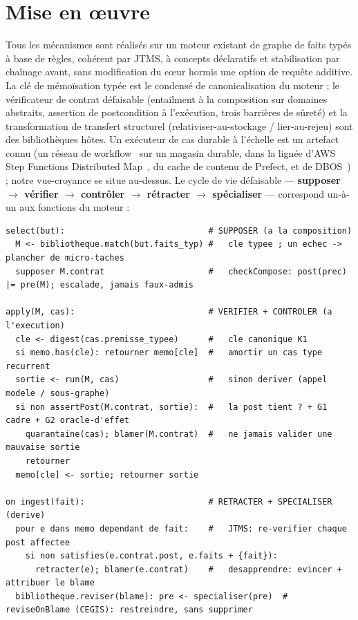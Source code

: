 \documentclass[11pt]{article}
\begin{document}
\section{Mise en œuvre}
Tous les mécanismes sont réalisés sur un moteur existant de graphe de faits typés à base de règles, cohérent par
JTMS, à concepts déclaratifs et stabilisation par chaînage avant, sans modification du cœur hormis une option de
requête additive. La clé de mémoïsation typée est le condensé de canonicalisation du moteur ; le vérificateur de
contrat défaisable (entailment à la composition sur domaines abstraits, assertion de postcondition à l'exécution,
trois barrières de sûreté) et la transformation de transfert structurel (relativiser-au-stockage /
lier-au-rejeu) sont des bibliothèques hôtes. Un exécuteur de cas durable à l'échelle est un artefact connu (un
réseau de workflow~\cite{vanderaalst1998} sur un magasin durable, dans la lignée d'AWS Step Functions Distributed
Map~\cite{aws2022}, du cache de contenu de Prefect, et de DBOS~\cite{dbos2022}) ; notre vue-croyance se situe
au-dessus. Le cycle de vie défaisable --- \textbf{supposer $\to$ vérifier $\to$ contrôler $\to$ rétracter $\to$
spécialiser} --- correspond un-à-un aux fonctions du moteur :

\begin{lstlisting}
select(but):                             # SUPPOSER (a la composition)
  M <- bibliotheque.match(but.faits_typ) #   cle typee ; un echec -> plancher de micro-taches
  supposer M.contrat                     #   checkCompose: post(prec) |= pre(M); escalade, jamais faux-admis

apply(M, cas):                           # VERIFIER + CONTROLER (a l'execution)
  cle <- digest(cas.premisse_typee)      #   cle canonique K1
  si memo.has(cle): retourner memo[cle]  #   amortir un cas type recurrent
  sortie <- run(M, cas)                  #   sinon deriver (appel modele / sous-graphe)
  si non assertPost(M.contrat, sortie):  #   la post tient ? + G1 cadre + G2 oracle-d'effet
    quarantaine(cas); blamer(M.contrat)  #   ne jamais valider une mauvaise sortie
    retourner
  memo[cle] <- sortie; retourner sortie

on ingest(fait):                         # RETRACTER + SPECIALISER (derive)
  pour e dans memo dependant de fait:    #   JTMS: re-verifier chaque post affectee
    si non satisfies(e.contrat.post, e.faits + {fait}):
      retracter(e); blamer(e.contrat)    #   desapprendre: evincer + attribuer le blame
  bibliotheque.reviser(blame): pre <- specialiser(pre)  # reviseOnBlame (CEGIS): restreindre, sans supprimer
\end{lstlisting}
\end{document}
